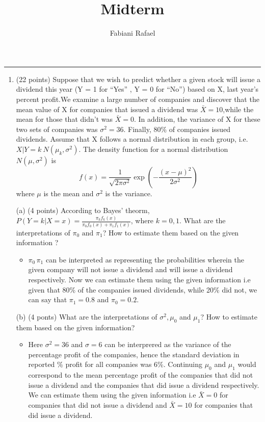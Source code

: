 \documentclass[
]{article}
\title{Midterm}
\author{Fabiani Rafael}
\date{}
\begin{document}
\maketitle

\thispagestyle{fancy}

\begin{center}\rule{0.5\linewidth}{0.5pt}\end{center}

\begin{enumerate}
\item (22 points) Suppose that we wish to predict whether a given stock will issue a dividend this year (Y = 1 for “Yes” , Y = 0 for “No”) based on X, last year’s percent profit.We examine a large number of companies and discover that the mean value of X for companies that issued a dividend was $\bar{X} = 10$,while the mean for those that didn’t was $\bar{X} = 0$. In addition, the variance of X for these two sets of companies was $\sigma^2 = 36$. Finally, 80\% of companies issued dividends.
Assume that X follows a normal distribution in each group, i.e. $X|Y = k ~ N(\mu_k, \sigma^2)$. The density function for a normal distribution $N(\mu, \sigma^2)$ is 
$$
f(x) = \frac{1}{\sqrt{2\pi\sigma^2}}\exp\left(-\frac{(x-\mu)^2}{2\sigma^2}\right)
$$
where $\mu$ is the mean and $\sigma^2$ is the variance.

(a) (4 points) According to Bayes’ theorm, $P(Y = k | X = x) = \frac{\pi_k f_k(x)}{\pi_0f_0(x) + \pi_1f_1(x)}$, where $k = 0, 1$. What are the interpretations of $\pi_0 \text{ and } \pi_1$? How to estimate them based on the given information ?

\begin{itemize}
\item $\pi_0 \, \pi_1$ can be interpreted as representing the probabilities wherein the given company will not issue a dividend and will issue a dividend respectively. Now we can estimate them using the given information i.e given that 80\% of the companies issued dividends, while 20\% did not, we can say that $\pi_1 = 0.8$ and $\pi_0 = 0.2$.
\end{itemize}


(b) (4 ponts) What are the interpretations of $\sigma^2, \mu_0$ and $\mu_1$? How to estimate them based on the given information?

\begin{itemize}
\item Here $\sigma^2 = 36$ and $\sigma = 6$ can be interprered as the variance of the percentage profit of the companies, hence the standard deviation in reported \% profit for all companies was 6\%. Continuing  $\mu_0$ and $\mu_1$ would correspond to the mean percentage profit of the companies that did not issue a dividend and the companies that did issue a dividend respectively. We can estimate them using the given information i.e $\bar{X} = 0$ for companies that did not issue a dividend and $\bar{X} = 10$ for companies that did issue a dividend.
\end{itemize}


\end{enumerate}
\end{document}
